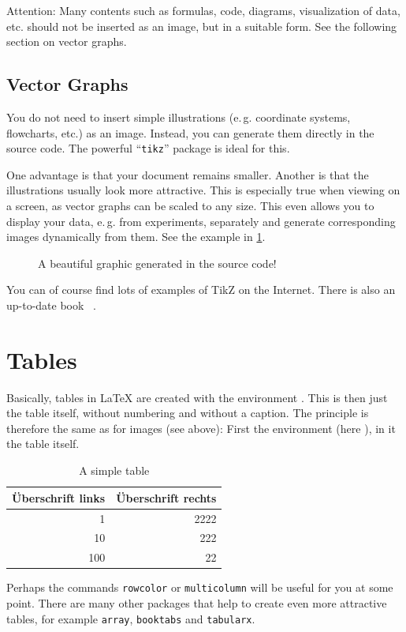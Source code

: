 Attention: Many contents such as formulas, code, diagrams, visualization of 
data, etc. should not be inserted as an image, but in a suitable form. See the 
following section on vector graphs.

\subsection{Vector Graphs}
\label{sec:vectorGraphcis}
%
You do not need to insert simple illustrations (e.\,g. coordinate systems, 
flowcharts, etc.) as an image. Instead, you can generate them directly in the 
source code. The powerful \enquote{\texttt{tikz}} package is ideal for this.

One advantage is that your document remains smaller. Another is that the 
illustrations usually look more attractive. This is especially true when 
viewing on a screen, as vector graphs can be scaled to any size. This even 
allows you to display your data,  e.\,g. from experiments, separately and 
generate corresponding images dynamically from them. See the example in
\cref{fig:plotFleuret}.
\begin{figure}[tbh]
\centering

\caption{A beautiful graphic generated in the source code!}
\label{fig:plotFleuret}
\end{figure}

You can of course find lots of examples of TikZ on the Internet. There is also 
an up-to-date book ~\cite{kottwitz:tikz}.

\section{Tables}
\label{sec:tables}

Basically, tables in \LaTeX{} are created with the  environment . 
This is
then just the table itself, without numbering and without a caption. The 
principle is therefore the same as for images (see above): First the environment 
(here ), in it the table itself.
%
\begin{table}[tbh]
 \centering
 \begin{tabular}{r|r}
 Überschrift links & Überschrift rechts\\
 \hline
 1   & 2222\\
 10  & 222\\
 100 & 22
 \end{tabular}
 \caption{A simple table}
 \label{tab:example}
\end{table}
%
Perhaps the commands \texttt{rowcolor} or \texttt{multicolumn} will be useful 
for you at some point. There are many other packages that help to create even 
more attractive tables, for example \texttt{array}, \texttt{booktabs} and 
\texttt{tabularx}.

